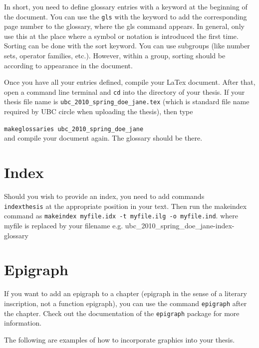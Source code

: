 \documentclass[msc,oneside]{ubcthesis}%
\begin{document}
In short, you need to define glossary entries with a keyword at the beginning of the document. You can use the \texttt{gls} with the keyword to add the corresponding page number to the glossary, where the gls command appears. In general, only use this at the place where a symbol or notation is introduced the first time. Sorting can be done with the sort keyword. You can use subgroups (like number sets, operator families, etc.). However, within a group, sorting should be according to appearance in the document.

Once you have all your entries defined, compile your LaTex document. After that, open a command line terminal and \texttt{cd} into the directory of your thesis. If your thesis file name is \texttt{ubc\_2010\_spring\_doe\_jane.tex} (which is standard file name required by UBC circle when uploading the thesis), then type

\texttt{makeglossaries ubc\_2010\_spring\_doe\_jane}\\
and compile your document again. The glossary should be there.

\section{Index}
Should you wish to provide an index, you need to add commands \texttt{\\index{thesis}} at the appropriate position in your text. Then run the makeindex command as
\texttt{makeindex myfile.idx -t myfile.ilg -o myfile.ind}.
where myfile is replaced by your filename e.g. ubc\_2010\_spring\_doe\_jane-index-glossary

\section{Epigraph}
If you want to add an epigraph to a chapter (epigraph in the sense of a literary inscription, not a function epigraph), you can use the command \texttt{epigraph} after the chapter. Check out the documentation of the \texttt{epigraph} package for more information.

The following are examples of how to incorporate graphics into your thesis.
\end{document}

